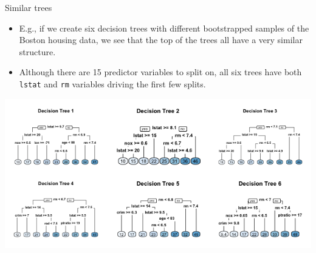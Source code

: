 \documentclass[
  10pt,
  ignorenonframetext,
]{beamer}
\providecommand{\tightlist}{%
  \setlength{\itemsep}{0pt}\setlength{\parskip}{0pt}}
\begin{document}
\begin{frame}[fragile]{Similar trees}
\protect\hypertarget{similar-trees}{}

\begin{itemize}
\tightlist
\item
  E.g., if we create six decision trees with different bootstrapped
  samples of the Boston housing data, we see that the top of the trees
  all have a very similar structure.
\item
  Although there are 15 predictor variables to split on, all six trees
  have both \texttt{lstat} and \texttt{rm} variables driving the first
  few splits.
\end{itemize}

\includegraphics{figure/tree-correlation-1.png}

\end{frame}
\end{document}
